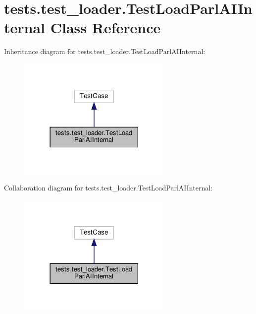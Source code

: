 \hypertarget{classtests_1_1test__loader_1_1TestLoadParlAIInternal}{}\section{tests.\+test\+\_\+loader.\+Test\+Load\+Parl\+A\+I\+Internal Class Reference}
\label{classtests_1_1test__loader_1_1TestLoadParlAIInternal}


Inheritance diagram for tests.\+test\+\_\+loader.\+Test\+Load\+Parl\+A\+I\+Internal\+:
\nopagebreak
\begin{figure}[H]
\begin{center}
\leavevmode
\includegraphics[width=213pt]{d8/ddf/classtests_1_1test__loader_1_1TestLoadParlAIInternal__inherit__graph}
\end{center}
\end{figure}


Collaboration diagram for tests.\+test\+\_\+loader.\+Test\+Load\+Parl\+A\+I\+Internal\+:
\nopagebreak
\begin{figure}[H]
\begin{center}
\leavevmode
\includegraphics[width=213pt]{d1/dd3/classtests_1_1test__loader_1_1TestLoadParlAIInternal__coll__graph}
\end{center}
\end{figure}
